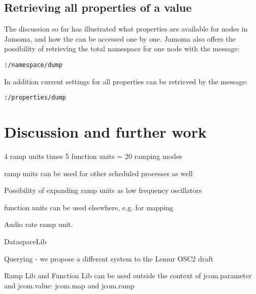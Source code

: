 \documentclass{sig-alternate}
\begin{document}

\subsection{Retrieving all properties of a value} %
\label{sub:retrieving_all_properties_of_a_value}

The discussion so far has illustrated what properties are available for nodes in Jamoma, and how the can be accessed one by one. Jamoma also offers the possibility of retrieving the total namespace for one node with the message: 

\texttt{:/namespace/dump}

In addition current settings for all properties can be retrieved by the message:

\texttt{:/properties/dump}






\section{Discussion and further work} %
\label{sec:discussion_and_further_work}

4 ramp units times 5 function units = 20 ramping modes

ramp units can be used for other scheduled processes as well

Possibility of expanding ramp units as low frequency oscillators

function units can be used elsewhere, e.g. for mapping

Audio rate ramp unit.

DataspaceLib

Querying - we propose a different system to the Lemur OSC2 draft

Ramp Lib and Function Lib can be used outside the context of jcom.parameter and jcom.value: jcom.map and jcom.ramp







\end{document}
